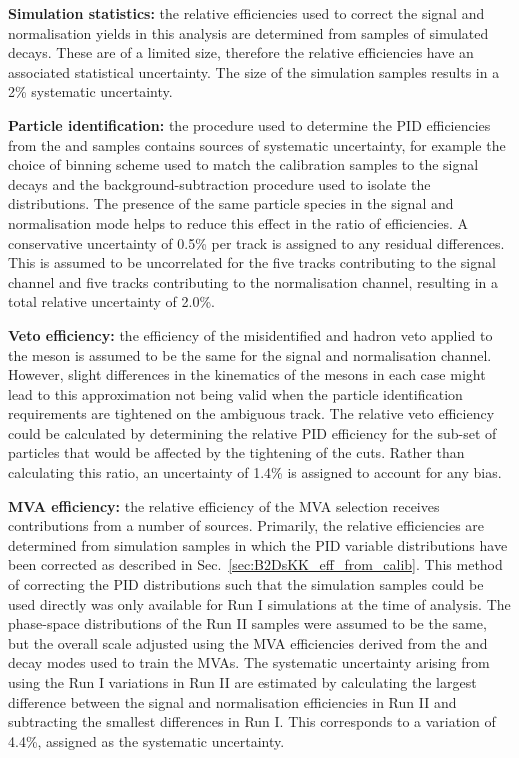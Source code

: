 \begin{description}
\item \textbf{Simulation statistics:} the relative efficiencies used to correct the signal and normalisation yields in this analysis are determined from samples of simulated decays. These are of a limited size, therefore the relative efficiencies have an associated statistical uncertainty. The size of the simulation samples results in a 2\% systematic uncertainty. 

\item \textbf{Particle identification:} the procedure used to determine the PID efficiencies from the \Dz and \Lc samples contains sources of systematic uncertainty, for example the choice of binning scheme used to match the calibration samples to the signal decays and the background-subtraction procedure used to isolate the distributions. The presence of the same particle species in the signal and normalisation mode helps to reduce this effect in the ratio of efficiencies. A conservative uncertainty of 0.5\% per track is assigned to any residual differences. This is assumed to be uncorrelated for the five tracks contributing to the signal channel and five tracks contributing to the normalisation channel, resulting in a total relative uncertainty of 2.0\%.

\item \textbf{Veto efficiency:} the efficiency of the misidentified \D and \Lc hadron veto applied to the \Dsp meson is assumed to be the same for the signal and normalisation channel. However, slight differences in the kinematics of the \Dsp mesons in each case might lead to this approximation not being valid when the particle identification requirements are tightened on the ambiguous track. The relative veto efficiency could be calculated by determining the relative PID efficiency for the sub-set of particles that would be affected by the tightening of the cuts. Rather than calculating this ratio, an uncertainty of 1.4\% is assigned to account for any bias.   

\item \textbf{MVA efficiency:} the relative efficiency of the MVA selection receives contributions from a number of sources. Primarily, the relative efficiencies are determined from simulation samples in which the PID variable distributions have been corrected as described in Sec.~\ref{sec:B2DsKK_eff_from_calib}. This method of correcting the PID distributions such that the simulation samples could be used directly was only available for Run I simulations at the time of analysis. The phase-space distributions of the Run II samples were assumed to be the same, but the overall scale adjusted using the MVA efficiencies derived from the \decay{\Bs}{\jpsi\phiz} and \decay{\Bsb}{\Dsp\pim} decay modes used to train the MVAs. The systematic uncertainty arising from using the Run I variations in Run II are estimated by calculating the largest difference between the signal and normalisation efficiencies in Run II and subtracting the smallest differences in Run I. This corresponds to a variation of 4.4\%, assigned as the systematic uncertainty.


\end{description}

